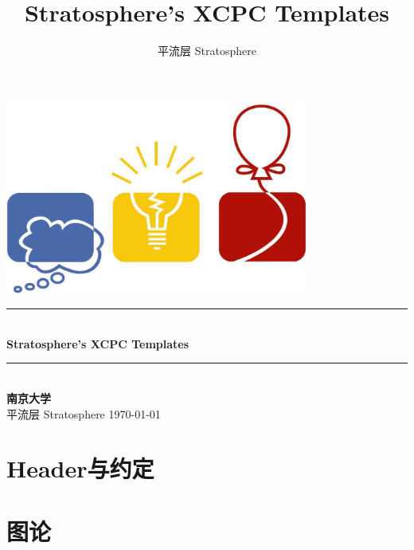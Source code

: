 \documentclass[twoside]{article}
\title{Stratosphere's XCPC Templates}
\author{平流层 Stratosphere}
\newcommand{\HRule}{\rule{\linewidth}{0.5mm}}
\begin{document}
\small
\begin{titlepage}
\begin{center}
\vspace*{0.5cm}\includegraphics[width=0.75\textwidth]{logo.jpg} \\ [2cm]
\HRule \\ [1cm]
\textbf{\Huge{Stratosphere's XCPC Templates}} \\ [0.5cm]
\HRule \\ [4cm]
\textbf{\Huge{南京大学}} \\ [1cm]
\LARGE{平流层 Stratosphere}
\vfill
\Large{\today}
\end{center}
\clearpage
\end{titlepage}
\tableofcontents\clearpage
\pagestyle{fancy}
\lfoot{}
\cfoot{\thepage}\rfoot{}
\setcounter{section}{-1}
\setcounter{page}{1}
\clearpage\section{Header与约定}
\clearpage\section{图论}
\end{document}
